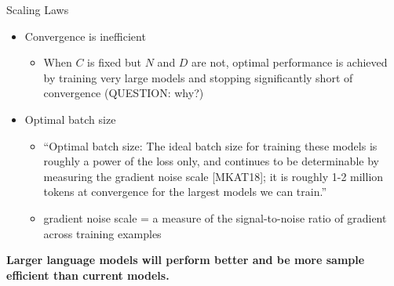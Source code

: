 
\begin{vbframe}{Scaling Laws}

\vfill

\begin{itemize}

	\item Convergence is inefficient
	\begin{itemize}
	\item When $C$ is fixed but $N$ and $D$ are not,
	optimal performance is achieved by training very
	large models and stopping significantly short of
	convergence (QUESTION: why?)  
	\end{itemize}

	\item Optimal batch size \qmark
	\begin{itemize}
\item ``Optimal batch size: The ideal batch size for training these
	models is roughly a power of the loss only, and
	continues to be determinable by measuring the
	gradient noise scale [MKAT18]; it is roughly 1-2
	million tokens at convergence for the largest models
	we can train.''
        \item gradient noise scale = a measure of the signal-to-noise
	ratio of gradient across training examples
	\end{itemize}

\end{itemize}

\vskip3mm

\textbf{Larger language models will perform better and be
	more sample efficient than current models. \qmark} 

\vfill

\end{vbframe}

